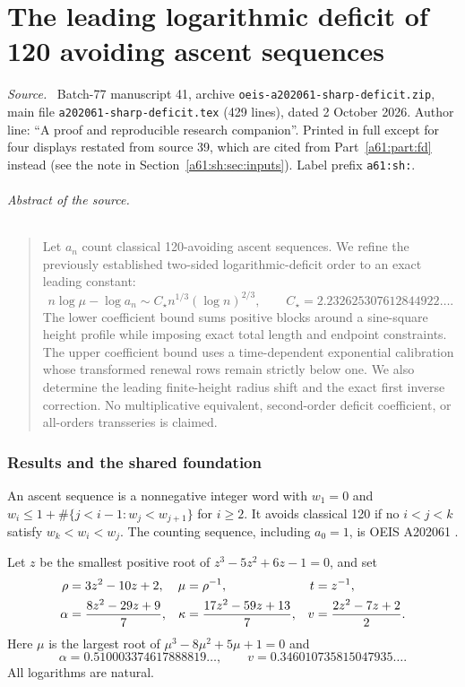 \documentclass[11pt,letterpaper]{article}
\numberwithin{equation}{section}
\theoremstyle{remark}\newtheorem{remark}[theorem]{Remark}
\newcommand{\st}{\star}
\newenvironment{partsource}{\par\medskip\noindent\begin{minipage}{\linewidth}\small\raggedright\textit{Source.}\ }{\end{minipage}\par\medskip}
\begin{document}
\part{The leading logarithmic deficit of 120 avoiding ascent sequences}\label{a61:part:sh}

\begin{partsource}
Batch-77 manuscript 41, archive \texttt{oeis-a202061-sharp-deficit.zip}, main file \texttt{a202061-sharp-deficit.tex} (429 lines), dated 2 October 2026. Author line: ``A proof and reproducible research companion''. Printed in full except for four displays restated from source 39, which are cited from Part~\ref{a61:part:fd} instead (see the note in Section~\ref{a61:sh:sec:inputs}). Label prefix \texttt{a61:sh:}.
\end{partsource}

\paragraph{Abstract of the source.}
\begin{quote}\small
Let $a_n$ count classical 120-avoiding ascent sequences. We refine the previously established two-sided logarithmic-deficit order to an exact leading constant:
\[
 n\log\mu-\log a_n\sim C_\st n^{1/3}(\log n)^{2/3},
 \qquad C_\st=2.232625307612844922\ldots.
\]
The lower coefficient bound sums positive blocks around a sine-square height profile while imposing exact total length and endpoint constraints. The upper coefficient bound uses a time-dependent exponential calibration whose transformed renewal rows remain strictly below one. We also determine the leading finite-height radius shift and the exact first inverse correction. No multiplicative equivalent, second-order deficit coefficient, or all-orders transseries is claimed.
\end{quote}

\section{Results and the shared foundation}
An ascent sequence is a nonnegative integer word with $w_1=0$ and
$w_i\le1+\#\{j<i-1:w_j<w_{j+1}\}$ for $i\ge2$. It avoids classical 120 if no $i<j<k$ satisfy $w_k<w_i<w_j$. The counting sequence, including $a_0=1$, is OEIS A202061 \cite{OEIS}.

Let $z$ be the smallest positive root of $z^3-5z^2+6z-1=0$, and set
\begin{align}\label{a61:sh:eq:constants}
 \rho&=3z^2-10z+2, &\mu&=\rho^{-1}, &t&=z^{-1},\notag\\
 \alpha&=\frac{8z^2-29z+9}{7},&
 \kappa&=\frac{17z^2-59z+13}{7},&
 v&=\frac{2z^2-7z+2}{2}.
\end{align}
Here $\mu$ is the largest root of $\mu^3-8\mu^2+5\mu+1=0$ and
\[
 \alpha=0.510003374617888819\ldots,\qquad
 v=0.346010735815047935\ldots.
\]
All logarithms are natural.
\end{document}
